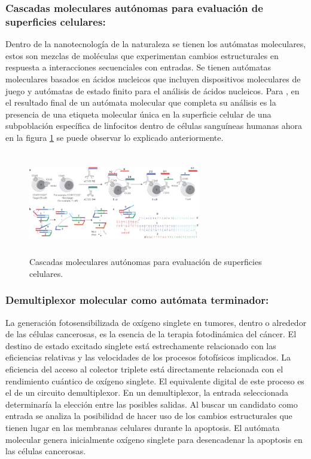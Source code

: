 \documentclass[10pt,conference]{IEEEtran}
\begin{document}
\vspace{2mm}
\subsubsection{\textbf{Cascadas moleculares autónomas para evaluación de superficies celulares: }}
Dentro de la nanotecnología de la naturaleza se tienen los autómatas moleculares, estos son mezclas de moléculas que experimentan cambios estructurales en respuesta a interacciones secuenciales con entradas. Se tienen autómatas moleculares basados en ácidos nucleicos que incluyen dispositivos moleculares de juego y autómatas de estado finito para el análisis de ácidos nucleicos. Para , en el resultado final de un autómata molecular que completa su análisis es la presencia de una etiqueta molecular única en la superficie celular de una subpoblación específica de linfocitos dentro de células sanguíneas humanas ahora en la figura \ref{Natural1} se puede observar lo explicado anteriormente.
\begin{figure}[H]
 \begin{center}
       \includegraphics[width=7.5cm, height=4.5cm]{Ind. Natural/Imagen_01.jpg}
      \caption{Cascadas moleculares autónomas para evaluación de superficies celulares.}
      \label{Natural1} 
      \end{center}
\end{figure}

\vspace{2mm}
\subsubsection{\textbf{Demultiplexor molecular como autómata terminador: }}
La generación fotosensibilizada de oxígeno singlete en tumores, dentro o alrededor de las células cancerosas, es la esencia de la terapia fotodinámica del cáncer. El destino de estado excitado singlete está estrechamente relacionado con las eficiencias relativas y las velocidades de los procesos fotofísicos implicados. La eficiencia del acceso al colector triplete está directamente relacionada con el rendimiento cuántico de oxígeno singlete. El equivalente digital de este proceso es el de un circuito demultiplexor. En un demultiplexor, la entrada seleccionada determinaría la elección entre las posibles salidas. Al buscar un candidato como entrada se analiza la posibilidad de hacer uso de los cambios estructurales que tienen lugar en las membranas celulares durante la apoptosis. El autómata molecular genera inicialmente oxígeno singlete para desencadenar la apoptosis en las células cancerosas.
\end{document}
